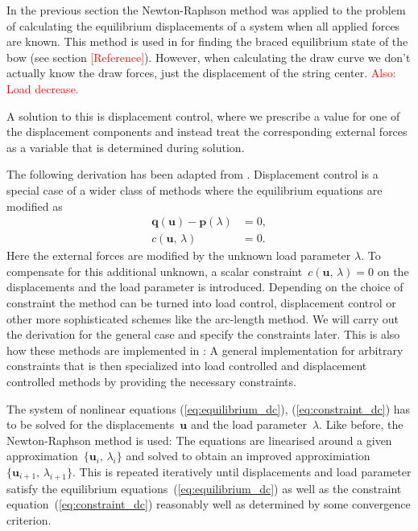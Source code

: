 In the previous section the Newton-Raphson method was applied to the problem of calculating the equilibrium displacements of a system when all applied forces are known. This method is used in \swtitle for finding the braced equilibrium state of the bow (see section \textcolor{red}{[Reference]}). However, when calculating the draw curve we don't actually know the draw forces, just the displacement of the string center. \textcolor{red}{Also: Load decrease.}

A solution to this is displacement control, where we prescribe a value for one of the displacement components and instead treat the corresponding external forces as a variable that is determined during solution.

The following derivation has been adapted from \cite{fem_script_uni_bochum}. Displacement control is a special case of a wider class of methods where the equilibrium equations are modified as
%
\begin{align}
\boldsymbol{q}(\boldsymbol{u}) - \boldsymbol{p}(\lambda) &= 0,\label{eq:equilibrium_dc}\\
c(\boldsymbol{u},\,\lambda) &= 0.\label{eq:constraint_dc}
\end{align}
%
Here the external forces are modified by the unknown load parameter $\lambda$. To compensate for this additional unknown, a scalar constraint~$c(\boldsymbol{u},\,\lambda) = 0$ on the displacements and the load parameter is introduced. Depending on the choice of constraint the method can be turned into load control, displacement control or other more sophisticated schemes like the arc-length method. We will carry out the derivation for the general case and specify the constraints later. This is also how these methods are implemented in \swtitle: A general implementation for arbitrary constraints that is then specialized into load controlled and displacement controlled methods by providing the necessary constraints.

The system of nonlinear equations (\ref{eq:equilibrium_dc}), (\ref{eq:constraint_dc}) has to be solved for the displacements~$\boldsymbol{u}$ and the load parameter~$\lambda$. Like before, the Newton-Raphson method is used: The equations are linearised around a given approximation~$\{\boldsymbol{u}_i,\,\lambda_i\}$ and solved to obtain an improved approximiation~$\{\boldsymbol{u}_{i+1},\,\lambda_{i+1}\}$. This is repeated iteratively until displacements and load parameter satisfy the equilibrium equations~(\ref{eq:equilibrium_dc}) as well as the constraint equation~(\ref{eq:constraint_dc}) reasonably well as determined by some convergence criterion.

